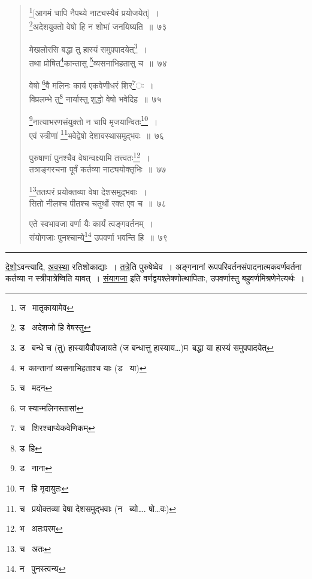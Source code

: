 \documentclass[11pt, openany]{book}
\begin{document}
\newpage

\begin{quote}
{\na \renewcommand{\thefootnote}{1}\footnote{ज \textendash\ मातृकायामेव}[आगमं चापि नैपथ्ये नाट्यस्यैवं प्रयोजयेत्]~।\\
\renewcommand{\thefootnote}{2}\footnote{ड \textendash\ अदेशजो हि वेषस्तु}अदेशयुक्तो वेषो हि न शोभां जनयिष्यति~॥~७३

मेखलोरसि बद्धा तु हास्यं समुपपादयेत्\renewcommand{\thefootnote}{3}\footnote{ड \textendash\ बन्धे च (तु) हास्यायैवौपजायते (ज बन्धात्तु हास्याय\ldots )म\textendash\ बद्धा या हास्यं समुपपादयेत्}~।\\
तथा प्रोषित\renewcommand{\thefootnote}{4}\footnote{भ\textendash\ कान्तानां व्यसनाभिहताश्च याः (ड \textendash\ या)}कान्तासु \renewcommand{\thefootnote}{5}\footnote{च \textendash\ मदन}व्यसनाभिहतासु च~॥~७४

वेषो \renewcommand{\thefootnote}{6}\footnote{ज स्यान्मलिनस्तासां}वै मलिनः कार्य एकवेणीधरं शिर\renewcommand{\thefootnote}{7}\footnote{च \textendash\ शिरश्चाप्येकवेणिकम्}ः~।\\
विप्रलम्भे तु\renewcommand{\thefootnote}{8}\footnote{ड\textendash\ हि} नार्यास्तु शुद्धो वेषो भवेदिह~॥~७५

\renewcommand{\thefootnote}{9}\footnote{ड \textendash\ नाना}नात्याभरणसंयुक्तो न चापि मृजयान्वितः\renewcommand{\thefootnote}{10}\footnote{न \textendash\ हि मृदायुतः}~।\\
एवं स्त्रीणां \renewcommand{\thefootnote}{11}\footnote{च \textendash\ प्रयोक्तव्या वेषा देशसमुद्भवाः (न \textendash\ ब्यो\ldots . षो\ldots वः)}भवेद्वेषो देशावस्थासमुद्भवः~॥~७६

पुरुषाणां पुनश्चैव वेषान्वक्ष्यामि तत्त्वतः\renewcommand{\thefootnote}{12}\footnote{भ \textendash\ अतःपरम्}~।\\
तत्राङ्गरचना पूर्वं कर्तव्या नाट्ययोक्तृभिः~॥~७७

\renewcommand{\thefootnote}{13}\footnote{च \textendash\ अतः}ततःपरं प्रयोक्तव्या वेषा देशसमुद्भवाः~।\\
सितो नीलश्च पीतश्च चतुर्थो रक्त एव च~॥~७८

एते स्वभावजा वर्णा यैः कार्यं त्वङ्गवर्तनम्~।\\
संयोगजाः पुनश्चान्ये\renewcommand{\thefootnote}{14}\footnote{न \textendash\ पुनस्त्वन्य} उपवर्णा भवन्ति हि~॥~७९}
\end{quote}

\hrule

\vspace{2mm}
\noindent
\underline{देशो}ऽवन्त्यादि, \underline{अवस्था} रतिशोकाद्याः~। \underline{तत्रे}ति पुरुषेष्वेव~। अङ्गनानां रूपपरिवर्तनसंपादनात्मकवर्णवर्तना कर्तव्या न स्त्रीपात्रेष्विति यावत्~। \underline{संयागजा} इति वर्णद्वयश्लेषणोत्थापिताः, उपवर्णास्तु बहुवर्णमिश्रणेनेत्यर्थः~।
\end{document}
